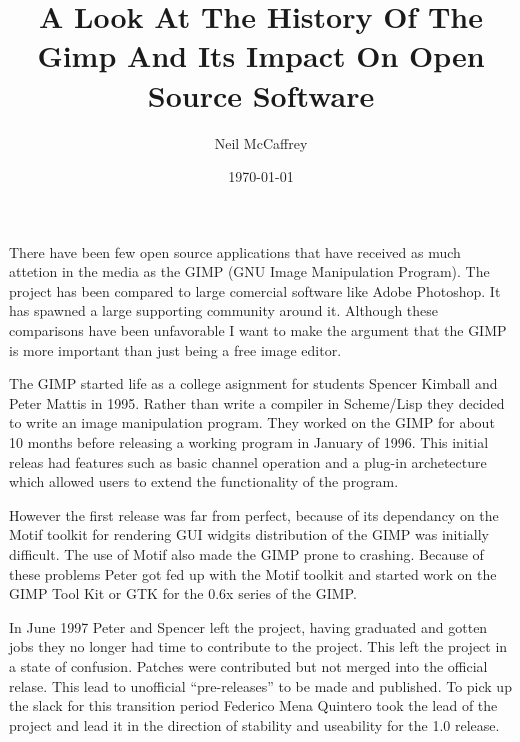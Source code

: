 \documentclass[a4 paper, 12pt]{article}
\begin{document}
\author{Neil McCaffrey}
\title{A Look At The History Of The Gimp And Its Impact On Open Source
Software}
\date{\today}
\maketitle


	There have been few open source applications that have received as much
	attetion in the media as the GIMP (GNU Image Manipulation Program). The
	project has been compared to large comercial software like Adobe Photoshop.
	It has spawned a large supporting community around it. Although these
	comparisons have been unfavorable I want to make the argument that the GIMP
	is more important than just being a free image editor.

	The GIMP started life as a college asignment for students Spencer Kimball
	and Peter Mattis in 1995. Rather than write a compiler in Scheme/Lisp they
	decided to write an image manipulation program. They worked on the GIMP for
	about 10 months before releasing a working program in January of 1996. This
	initial releas had features such as basic channel operation and a plug-in
	archetecture which allowed users to extend the functionality of the
	program.

	However the first release was far from perfect, because of its dependancy
	on the Motif toolkit for rendering GUI widgits distribution of the GIMP was
	initially difficult. The use of Motif also made the GIMP prone to crashing.
	Because of these problems Peter got fed up with the Motif toolkit and
	started work on the GIMP Tool Kit or GTK for the 0.6x series of the GIMP.

	In June 1997 Peter and Spencer left the project, having graduated and gotten
	jobs they no longer had time to contribute to the project. This left the
	project in a state of confusion. Patches were contributed but not merged
	into the official relase. This lead to unofficial ``pre-releases'' to be
	made and published. To pick up the slack for this transition period Federico
	Mena Quintero took the lead of the project and lead it in the direction of
	stability and useability for the 1.0 release.
\end{document}
